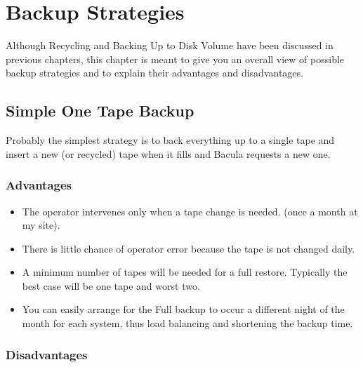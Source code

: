 
\section*{Backup Strategies}
\label{_ChapterStart3}

Although Recycling and Backing Up to Disk Volume have been discussed in
previous chapters, this chapter is meant to give you an overall view of
possible backup strategies and to explain their advantages and disadvantages. 
\label{Simple}

\subsection*{Simple One Tape Backup}

Probably the simplest strategy is to back everything up to a single tape and
insert a new (or recycled) tape when it fills and Bacula requests a new one. 

\subsubsection*{Advantages}

\begin{itemize}
\item The operator intervenes only when a tape change is needed.  (once a
   month at my site).  
\item There is little chance of operator error because the tape  is not
   changed daily.  
\item A minimum number of tapes will be needed for a full restore.  Typically
   the best case will be one tape and worst two.  
\item You can easily arrange for the Full backup to occur a different  night
   of the month for each system, thus load balancing and  shortening the backup
   time. 
\end{itemize}

\subsubsection*{Disadvantages}

